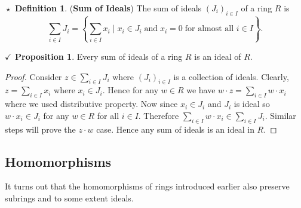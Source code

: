 \documentclass{article}
\theoremstyle{definition}
\newtheorem{definition}{$\boxed{\star}$ Definition}
\theoremstyle{remark}
\theoremstyle{definition}
\theoremstyle{definition}
\newtheorem{proposition}{$\checkmark$ Proposition}
\theoremstyle{definition}
\theoremstyle{proof}
\begin{document}
\hrulefill
\begin{definition}
	(\textbf{Sum of Ideals}) The sum of ideals $ (J_i)_{i\in I} $ of a ring $ R $ is 
	\[\sum_{i\in I} J_i = \left \{ \sum_{i\in I}x_i \;\vert\; x_i\in J_i \;\text{and}\;x_i = 0 \;\text{for almost all } i\in I \right \}.\]
\end{definition}
\hrulefill
\begin{proposition}
	Every sum of ideals of a ring $ R $ is an ideal of $ R $.
\end{proposition}
\begin{proof}
	Consider $z\in \sum_{i\in I} J_i $ where $ (J_i)_{i\in I} $ is a collection of ideals. Clearly, $ z = \sum_{i\in I} x_i $ where $ x_i \in J_i $. Hence for any $ w\in R $ we have $ w\cdot z = \sum_{i\in I} w\cdot x_i $ where we used distributive property. Now since $ x_i\in J_i $ and $ J_i $ is ideal so $ w\cdot x_i \in J_i $ for any $ w\in R $ for all $ i\in I $. Therefore $ \sum_{i\in I} w\cdot x_i \in \sum_{i\in I} J_i $. Similar steps will prove the $ z\cdot w $ case. Hence any sum of ideals is an ideal in $ R $.
\end{proof}
\hrulefill
\newpage
\subsection{Homomorphisms}
It turns out that the homomorphisms of rings introduced earlier also preserve subrings and to some extent ideals.
\end{document}
